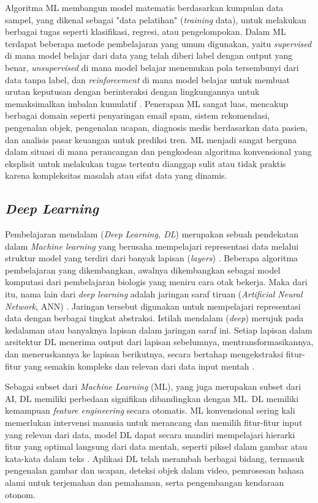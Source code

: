Algoritma ML membangun model matematis berdasarkan kumpulan data sampel, yang dikenal sebagai "data pelatihan" (\textit{training} data), untuk melakukan berbagai tugas seperti klasifikasi, regresi, atau pengelompokan.
Dalam ML terdapat beberapa metode pembelajaran yang umum digunakan, yaitu \textit{supervised} di mana model belajar dari data yang telah diberi label dengan output yang benar, \textit{unsupervised} di mana model belajar menemukan pola tersembunyi dari data tanpa label, dan \textit{reinforcement} di mana model belajar untuk membuat urutan keputusan dengan berinteraksi dengan lingkungannya untuk memaksimalkan imbalan kumulatif \cite{choi2020IntroductionML_NN_DL}.
Penerapan ML sangat luas, mencakup berbagai domain seperti penyaringan email spam, sistem rekomendasi, pengenalan objek, pengenalan ucapan, diagnosis medis berdasarkan data pasien, dan analisis pasar keuangan untuk prediksi tren.
ML menjadi sangat berguna dalam situasi di mana perancangan dan pengkodean algoritma konvensional yang eksplisit untuk melakukan tugas tertentu dianggap sulit atau tidak praktis karena kompleksitas masalah atau sifat data yang dinamis.


\subsection{\textit{Deep Learning}}
Pembelajaran mendalam (\textit{Deep Learning, DL}) merupakan sebuah pendekatan dalam \textit{Machine learning} yang berusaha mempelajari representasi data melalui struktur model yang terdiri dari banyak lapisan (\textit{layers}) \cite{IanGoodfellow2016DeepLearning}.
Beberapa algoritma pembelajaran yang dikembangkan, awalnya dikembangkan sebagai model komputasi dari pembelajaran biologis yang meniru cara otak bekerja.
Maka dari itu, nama lain dari \textit{deep learning} adalah jaringan saraf tiruan (\textit{Artificial Neural Network}, ANN) \cite{IanGoodfellow2016DeepLearning}.
Jaringan tersebut digunakan untuk mempelajari representasi data dengan berbagai tingkat abstraksi.
Istilah mendalam (\textit{deep}) merujuk pada kedalaman atau banyaknya lapisan dalam jaringan saraf ini.
Setiap lapisan dalam arsitektur DL menerima output dari lapisan sebelumnya, mentransformasikannya, dan meneruskannya ke lapisan berikutnya, secara bertahap mengekstraksi fitur-fitur yang semakin kompleks dan relevan dari data input mentah \cite{IanGoodfellow2016DeepLearning}.

Sebagai subset dari \textit{Machine Learning} (ML), yang juga merupakan subset dari AI, DL memiliki perbedaan signifikan dibandingkan dengan ML.
DL memiliki kemampuan \textit{feature engineering} secara otomatis.
ML konvensional sering kali memerlukan intervensi manusia untuk merancang dan memilih fitur-fitur input yang relevan dari data, model DL dapat secara mandiri mempelajari hierarki fitur yang optimal langsung dari data mentah, seperti piksel dalam gambar atau kata-kata dalam teks \cite{IanGoodfellow2016DeepLearning}.
Aplikasi DL telah merambah berbagai bidang, termasuk pengenalan gambar dan ucapan, deteksi objek dalam video, pemrosesan bahasa alami untuk terjemahan dan pemahaman, serta pengembangan kendaraan otonom.



